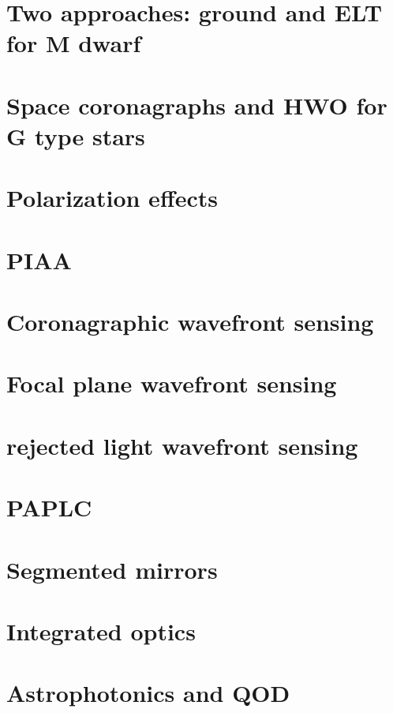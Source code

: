 \documentclass[letterpaper]{ar-1col}
\begin{document}
\section{Two approaches: ground and ELT for M dwarf}
\lipsum[2-4]

\section{Space coronagraphs and HWO for G type stars}
\lipsum[2-4]

\section{Polarization effects} 
\lipsum[2-4]

\section{PIAA}
\lipsum[2-4]

\section{Coronagraphic wavefront sensing}
\lipsum[2-4]

\section{Focal plane wavefront sensing}
\lipsum[2-4]

\section{rejected light wavefront sensing} 
\lipsum[2-4]

\section{PAPLC}
\lipsum[2-4]

\section{Segmented mirrors}
\lipsum[2-4]

\section{Integrated optics}
\lipsum[2-4]

\section{Astrophotonics and QOD}
\lipsum[2-4]
\end{document}
